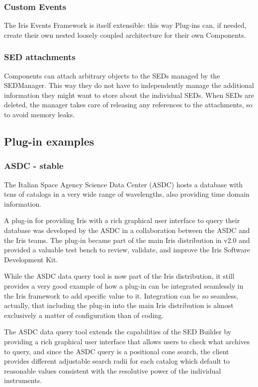 \subsubsection{Custom Events}
The Iris Events Framework is itself extensible: this way Plug-ins can, if needed, create their own nested loosely coupled architecture for their own Components.

\subsubsection{SED attachments}
Components can attach arbitrary objects to the SEDs managed by the SEDManager. This way they do not have to independently manage the additional information they might want to store about the individual SEDs. When SEDs are deleted, the manager takes care of releasing any references to the attachments, so to avoid memory leaks.



\subsection{Plug-in examples}
\subsubsection{ASDC - stable}
The Italian Space Agency Science Data Center (ASDC) hosts a database with tens of catalogs in a very wide range of wavelengths, also providing time domain information.

A plug-in for providing Iris with a rich graphical user interface to query their database was developed by the ASDC in a collaboration between the ASDC and the Iris teams. The plug-in became part of the main Iris distribution in v2.0 and provided a valuable test bench to review, validate, and improve the Iris Software Development Kit.

While the ASDC data query tool is now part of the Iris distribution, it still provides a very good example of how a plug-in can be integrated seamlessly in the Iris framework to add specific value to it. Integration can be so seamless, actually, that including the plug-in into the main Iris distribution is almost exclusively a matter of configuration than of coding.

The ASDC data query tool extends the capabilities of the SED Builder by providing a rich graphical user interface that allows users to check what archives to query, and since the ASDC query is a positional cone search, the client provides different adjustable search radii for each catalog which default to reasonable values consistent with the resolutive power of the individual instruments.

